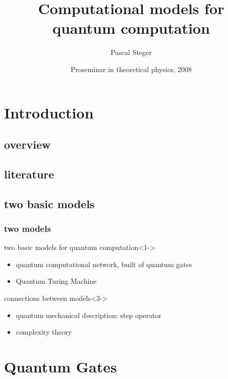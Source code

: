 \documentclass{beamer}
\title{Computational models for\\ quantum computation}
\author{Pascal Steger}
\date[10. 03. 2008]{Proseminar in theoretical physics, 2008}
\begin{document}
%
\begin{frame}
    \titlepage
\end{frame}
%
%
\section{Introduction}
%
\subsection{overview}
\begin{frame}
    \tableofcontents
\end{frame}
%
\subsection{literature}
\begin{frame}
    
    
	\hfill\vfill
	\cite{benioff1998}
	\cite{deutsch1985}
	\cite{deutsch1989}
	\cite{yao1993}
\end{frame}
%
\subsection{two basic models}
\begin{frame}
	\frametitle{two models}
    \begin{block}{two basic models for quantum computation}<1->
	    \begin{itemize}
    	    \item<2-> quantum computational network, built of quantum gates
        	\item<2-> Quantum Turing Machine
    	\end{itemize}
	\end{block}
	\begin{block}{connections between models}<3->
		\begin{itemize}
			\item<4-> quantum mechanical description: step operator
			\item<4-> complexity theory
		\end{itemize}
	\end{block}
\end{frame}
%
\begin{frame}
	\tableofcontents
\end{frame}
%
%
\section{Quantum Gates}
%
\end{document}

